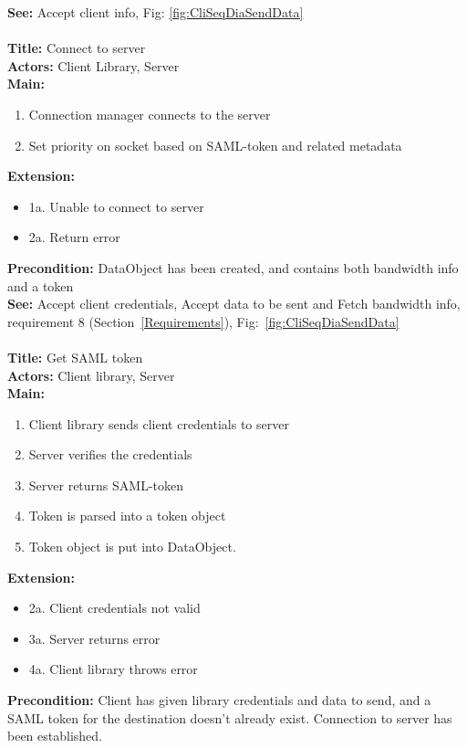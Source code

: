 		\textbf{See:} Accept client info, Fig: \ref{fig:CliSeqDiaSendData}
		\\\\
		\textbf{Title:} Connect to server \\
		\textbf{Actors:} Client Library, Server \\
		\textbf{Main:}
		\begin{enumerate}	
			\item Connection manager connects to the server
			\item Set priority on socket based on SAML-token and related metadata
		\end{enumerate}
		\textbf{Extension:}
		\begin{itemize}
			  \item[] 1a. Unable to connect to server
			  \item[] 2a. Return error
		\end{itemize}
		\textbf{Precondition:} DataObject has been created, and contains both bandwidth info and a token \\
		\textbf{See:} Accept client credentials, Accept data to be sent and Fetch bandwidth info, requirement 8 (Section~\ref{Requirements}), Fig:~\ref{fig:CliSeqDiaSendData}
		\\\\
		\textbf{Title:} Get SAML token \\
		\textbf{Actors:} Client library, Server \\
		\textbf{Main:}
		\begin{enumerate}
			\item Client library sends client credentials to server
			\item Server verifies the credentials
			\item Server returns SAML-token
			\item Token is parsed into a token object
			\item Token object is put into DataObject.
		\end{enumerate}
		\textbf{Extension:}
		\begin{itemize}
	        \item[] 2a. Client credentials not valid
			\item[] 3a. Server returns error
			\item[] 4a. Client library throws error
		\end{itemize}
		\textbf{Precondition:} Client has given library credentials and data to send, and a SAML token for the destination doesn't already exist. Connection to server has been established. \\
